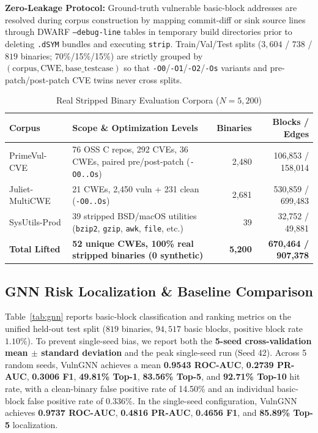 \documentclass[10pt,conference]{IEEEtran}
\begin{document}
\textbf{Zero-Leakage Protocol:} Ground-truth vulnerable basic-block addresses are resolved during corpus construction by mapping commit-diff or sink source lines through DWARF \texttt{--debug-line} tables in temporary build directories prior to deleting \texttt{.dSYM} bundles and executing \texttt{strip}. Train/Val/Test splits ($3{,}604$ / $738$ / $819$ binaries; 70\%/15\%/15\%) are strictly grouped by $(\text{corpus}, \text{CWE}, \text{base\_testcase})$ so that \texttt{-O0}/\texttt{-O1}/\texttt{-O2}/\texttt{-Os} variants and pre-patch/post-patch CVE twins never cross splits.

\begin{table}[!t]
\caption{Real Stripped Binary Evaluation Corpora ($N = 5{,}200$)}
\label{tab:corpora}
\renewcommand{\arraystretch}{1.0}
\footnotesize
\setlength\tabcolsep{2.5pt}
\begin{tabular}{lp{2.85cm}rr}
\toprule
\textbf{Corpus} & \textbf{Scope \& Optimization Levels} & \textbf{Binaries} & \textbf{Blocks / Edges} \\
\midrule
PrimeVul-CVE~\cite{ding2024primevul} & 76 OSS C repos, 292 CVEs, 36 CWEs, paired pre/post-patch (\texttt{-O0..Os}) & 2{,}480 & 106{,}853 / 158{,}014 \\
Juliet-MultiCWE~\cite{juliet2010} & 21 CWEs, 2{,}450 vuln + 231 clean (\texttt{-O0..Os}) & 2{,}681 & 530{,}859 / 699{,}483 \\
SysUtils-Prod & 39 stripped BSD/macOS utilities (\texttt{bzip2}, \texttt{gzip}, \texttt{awk}, \texttt{file}, etc.) & 39 & 32{,}752 / 49{,}881 \\
\midrule
\textbf{Total Lifted} & \textbf{52 unique CWEs, 100\% real stripped binaries (0 synthetic)} & \textbf{5{,}200} & \textbf{670{,}464 / 907{,}378} \\
\bottomrule
\end{tabular}
\end{table}

\subsection{GNN Risk Localization & Baseline Comparison}
Table~\ref{tab:gnn} reports basic-block classification and ranking metrics on the unified held-out test split ($819$ binaries,
$94{,}517$ basic blocks, positive block rate $1.10\%$). To prevent single-seed bias, we report both the \textbf{5-seed cross-validation
mean $\pm$ standard deviation} and the peak single-seed run (Seed 42). Across 5 random seeds, VulnGNN achieves a mean \textbf{0.9543 ROC-AUC},
\textbf{0.2739 PR-AUC}, \textbf{0.3006 F1}, \textbf{49.81\% Top-1}, \textbf{83.56\% Top-5}, and \textbf{92.71\% Top-10} hit rate, with a clean-binary
false positive rate of 14.50\% and an individual basic-block false positive rate of 0.336\%. In the single-seed configuration, VulnGNN
achieves \textbf{0.9737 ROC-AUC}, \textbf{0.4816 PR-AUC}, \textbf{0.4656 F1}, and \textbf{85.89\% Top-5} localization.
\end{document}
